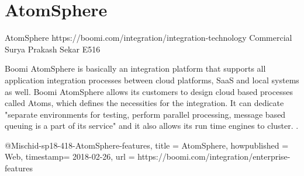 \section{AtomSphere}

AtomSphere
https://boomi.com/integration/integration-technology
Commercial
Surya Prakash Sekar
E516

Boomi AtomSphere is basically an integration platform that supports all 
application integration processes between cloud platforms, SaaS and local 
systems as well. Boomi AtomSphere allows its customers to design cloud based 
processes called Atoms, which defines the necessities for the integration.
It can dedicate "separate environments for testing, perform 
parallel processing, message based queuing is a part of its service" and it 
also allows its run time engines to cluster. 
\cite{hid-sp18-418-AtomSphere-features}. 

@Misc{hid-sp18-418-AtomSphere-features,
title = {AtomSphere},
howpublished = {Web},
timestamp= {2018-02-26},
url = {https://boomi.com/integration/enterprise-features}
}